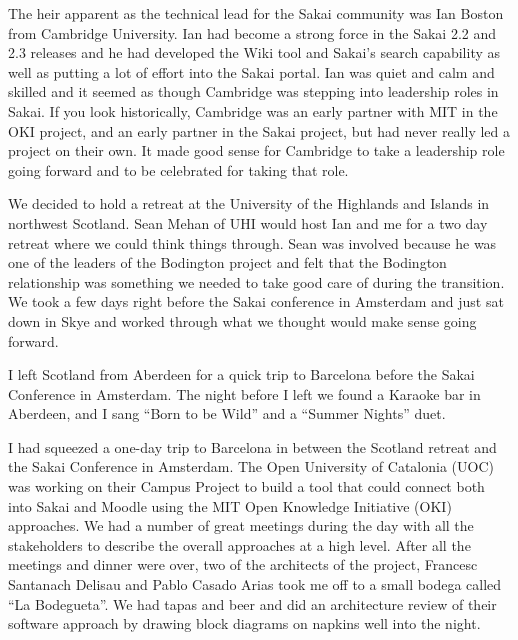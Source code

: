 \documentclass[12pt]{book}
\begin{document}
The heir apparent as the technical lead for the Sakai community was Ian Boston
from Cambridge University.  Ian had become a strong force in the Sakai 2.2 and 2.3 releases
and he had developed the Wiki tool and Sakai's search capability as well as putting a lot
of effort into the Sakai portal.   Ian was quiet and calm and skilled and it seemed
as though Cambridge was stepping into leadership roles in Sakai.  If you look historically,
Cambridge was an early partner with MIT in the OKI project, and an early partner in the Sakai
project, but had never really led a project on their own.  It made good sense for Cambridge
to take a leadership role going forward and to be celebrated for taking that role.


We decided to hold a retreat at the University of the Highlands and Islands
in northwest Scotland.  Sean Mehan of UHI would host Ian and me for a two day retreat
where we could think things through.  Sean was involved because he was one of the leaders
of the Bodington project and felt that the Bodington relationship was something we needed
to take good care of during the transition.   We took a few days right before the Sakai
conference in Amsterdam and just sat down in Skye and worked through what we thought would
make sense going forward.

I left Scotland from Aberdeen for a quick trip to Barcelona before the Sakai Conference
in Amsterdam.  The night before I left we found a Karaoke bar in Aberdeen, and I sang
``Born to be Wild'' and a ``Summer Nights'' duet.


I had squeezed a one-day trip to Barcelona in between the Scotland retreat and 
the Sakai Conference in Amsterdam.   The Open University of Catalonia (UOC) was working
on their Campus Project to build a tool that could connect both into Sakai and Moodle
using the MIT Open Knowledge Initiative (OKI) approaches.  We had a number of great meetings
during the day with all the stakeholders to describe the overall approaches at a high level.
After all the meetings and dinner were over, two of the architects of the 
project, Francesc Santanach Delisau and Pablo Casado Arias took me off to a small 
bodega called ``La Bodegueta''.   We had tapas and beer and did an architecture review of 
their software approach by drawing block diagrams on napkins well into the night.
\end{document}
